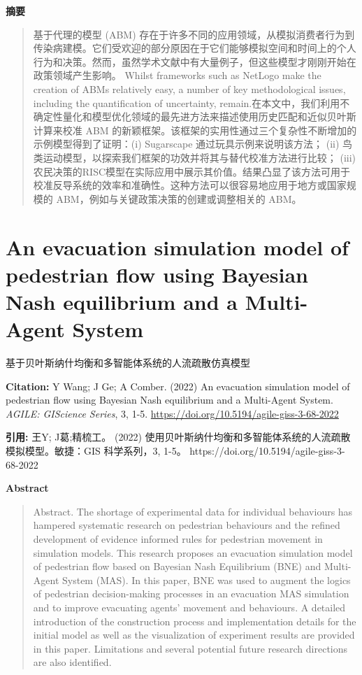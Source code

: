 \noindent\textbf{摘要}\par
\begin{quote}\small
基于代理的模型 (ABM) 存在于许多不同的应用领域，从模拟消费者行为到传染病建模。它们受欢迎的部分原因在于它们能够模拟空间和时间上的个人行为和决策。然而，虽然学术文献中有大量例子，但这些模型才刚刚开始在政策领域产生影响。 Whilst frameworks such as NetLogo make the creation of ABMs relatively easy, a number of key methodological issues, including the quantification of uncertainty, remain.在本文中，我们利用不确定性量化和模型优化领域的最先进方法来描述使用历史匹配和近似贝叶斯计算来校准 ABM 的新颖框架。该框架的实用性通过三个复杂性不断增加的示例模型得到了证明：(i) Sugarscape 通过玩具示例来说明该方法； (ii) 鸟类运动模型，以探索我们框架的功效并将其与替代校准方法进行比较； (iii)农民决策的RISC模型在实际应用中展示其价值。结果凸显了该方法可用于校准反导系统的效率和准确性。这种方法可以很容易地应用于地方或国家规模的 ABM，例如与关键政策决策的创建或调整相关的 ABM。
\end{quote}

\vspace{0.5em}


\chapter{An evacuation simulation model of pedestrian flow using Bayesian Nash equilibrium and a Multi-Agent System}
\begin{center}\small 基于贝叶斯纳什均衡和多智能体系统的人流疏散仿真模型\end{center}

\noindent\textbf{Citation:} Y Wang; J Ge; A Comber. (2022) An evacuation simulation model of pedestrian flow using Bayesian Nash equilibrium and a Multi-Agent System. \textit{AGILE: GIScience Series}, 3, 1-5. \url{https://doi.org/10.5194/agile-giss-3-68-2022}

\vspace{0.5em}
\noindent\textbf{引用:} 王Y; J葛;精梳工。 (2022) 使用贝叶斯纳什均衡和多智能体系统的人流疏散模拟模型。敏捷：GIS 科学系列，3, 1-5。 https://doi.org/10.5194/agile-giss-3-68-2022

\vspace{1.5em}
\noindent\textbf{Abstract}\par
\begin{quote}\small
Abstract. The shortage of experimental data for individual behaviours has hampered systematic research on pedestrian behaviours and the refined development of evidence informed rules for pedestrian movement in simulation models. This research proposes an evacuation simulation model of pedestrian flow based on Bayesian Nash Equilibrium (BNE) and Multi-Agent System (MAS). In this paper, BNE was used to augment the logics of pedestrian decision-making processes in an evacuation MAS simulation and to improve evacuating agents’ movement and behaviours. A detailed introduction of the construction process and implementation details for the initial model as well as the visualization of experiment results are provided in this paper. Limitations and several potential future research directions are also identified.
\end{quote}

